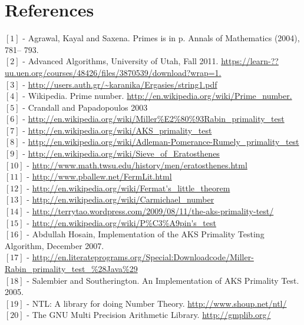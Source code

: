 \documentclass[paper=a4, fontsize=11pt]{scrartcl}	%
\numberwithin{equation}{section}		%
\numberwithin{figure}{section}		%
\numberwithin{table}{section}		%
\begin{document}
\section{References}
$[1]$ - Agrawal, Kayal and Saxena. Primes is in p. Annals of Mathematics (2004), 781-- 793.\\
$[2]$ - Advanced Algorithms, University of Utah, Fall 2011. \url{https://learn-?? uu.uen.org/courses/48426/files/3870539/download?wrap=1.}\\
$[3]$ - \url{http://users.auth.gr/~karanika/Ergasies/string1.pdf}\\
$[4]$ - Wikipedia. Prime number. \url{http://en.wikipedia.org/wiki/Prime_number.}\\
$[5]$ - Crandall and Papadopoulos 2003\\
$[6]$ - \url{http://en.wikipedia.org/wiki/Miller%E2%80%93Rabin_primality_test}\\
$[7]$ - \url{http://en.wikipedia.org/wiki/AKS_primality_test}\\
$[8]$ - \url{http://en.wikipedia.org/wiki/Adleman-Pomerance-Rumely_primality_test}\\
$[9]$ - \url{http://en.wikipedia.org/wiki/Sieve_of_Eratosthenes}\\
$[10]$ - \url{http://www.math.twsu.edu/history/men/eratosthenes.html}\\
$[11]$ - \url{http://www.pballew.net/FermLit.html}\\
$[12]$ - \url{http://en.wikipedia.org/wiki/Fermat's_little_theorem}\\
$[13]$ - \url{http://en.wikipedia.org/wiki/Carmichael_number}\\
$[14]$ - \url{http://terrytao.wordpress.com/2009/08/11/the-aks-primality-test/}\\
$[15]$ - \url{http://en.wikipedia.org/wiki/P%C3%A9pin's_test}\\
$[16]$ - Abdullah Hosain, Implementation of the AKS Primality Testing Algorithm, December 2007.\\
$[17]$ - \url{http://en.literateprograms.org/Special:Downloadcode/Miller-Rabin_primality_test_%28Java%29}\\
$[18]$ -  Salembier and Southerington. An Implementation of AKS Primality Test. 2005.\\
$[19]$ - NTL: A library for doing Number Theory. \url{http://www.shoup.net/ntl/}\\
$[20]$ - The GNU Multi Precision Arithmetic Library. \url{http://gmplib.org/}\\


\end{document}
